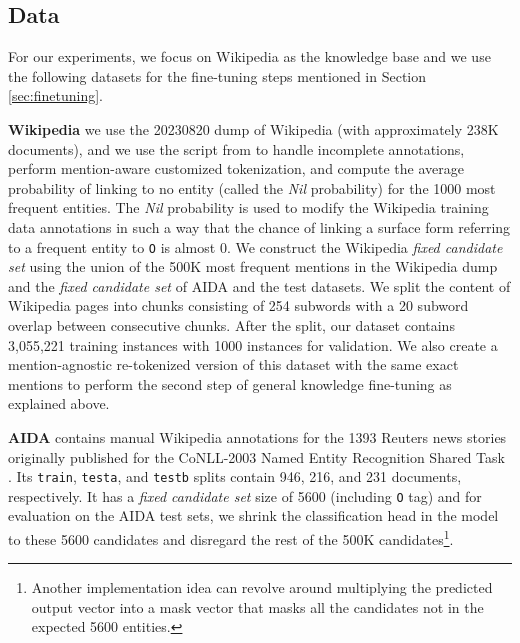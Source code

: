\documentclass[11pt]{article}
\begin{document}
\subsection{Data}
For our experiments, we focus on Wikipedia as the knowledge base and we use the following datasets for the fine-tuning steps mentioned in Section \ref{sec:finetuning}.

\textbf{Wikipedia} we use the 20230820 dump of Wikipedia (with approximately 238K documents), and we use the script from \cite{K19-1063} to handle incomplete annotations, perform mention-aware customized tokenization, and compute the average probability of linking to no entity (called the \textit{Nil} probability) for the 1000 most frequent entities. The \textit{Nil} probability is used to modify the Wikipedia training data annotations in such a way that the chance of linking a surface form referring to a frequent entity to \texttt{O} is almost 0. We construct the Wikipedia \textit{fixed candidate set} using the union of the 500K most frequent mentions in the Wikipedia dump and the \textit{fixed candidate set} of AIDA and the test datasets. We split the content of Wikipedia pages into chunks consisting of 254 subwords with a 20 subword overlap between consecutive chunks. After the split, our dataset contains 3,055,221 training instances with 1000 instances for validation. 
We also create a mention-agnostic re-tokenized version of this dataset with the same exact mentions to perform the second step of general knowledge fine-tuning as explained above.

\textbf{AIDA} \cite{D11-1072} contains manual Wikipedia annotations for the 1393 Reuters news stories originally published for the CoNLL-2003 Named Entity Recognition Shared Task \cite{CoNLL2003}. 
Its \texttt{train}, \texttt{testa}, and \texttt{testb} splits contain 946, 216, and 231 documents, respectively.
It has a \textit{fixed candidate set} size of 5600 (including \texttt{O} tag) and for evaluation on the AIDA test sets, we shrink the classification head in the model to these 5600 candidates and disregard the rest of the 500K candidates\footnote{Another implementation idea can revolve around multiplying the predicted output vector into a mask vector that masks all the candidates not in the expected 5600 entities.}.
\end{document}
